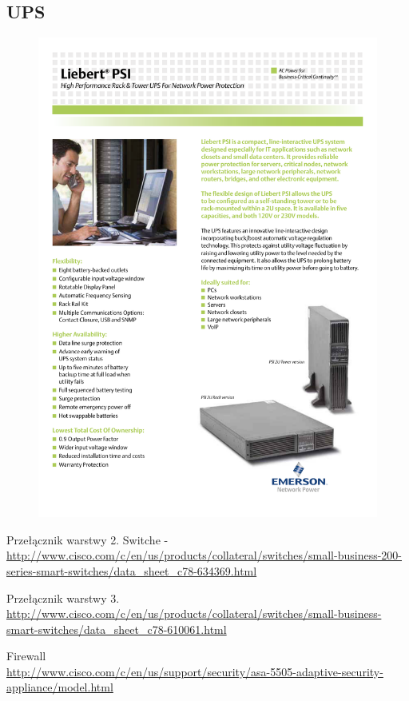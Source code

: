 \documentclass[a4paper, 12pt]{article}
\begin{document}
\subsection{UPS}
\begin{figure}[H]
\centering
    \includegraphics[scale=0.80]{spec/ups.pdf}%
    \label{fig:PropProf}
\end{figure}

Przełącznik warstwy 2.
Switche - 
\\\url{http://www.cisco.com/c/en/us/products/collateral/switches/small-business-200-series-smart-switches/data_sheet_c78-634369.html}

Przełącznik warstwy 3.
\\\url{http://www.cisco.com/c/en/us/products/collateral/switches/small-business-smart-switches/data_sheet_c78-610061.html}

Firewall
\\\url{http://www.cisco.com/c/en/us/support/security/asa-5505-adaptive-security-appliance/model.html}
\end{document}
